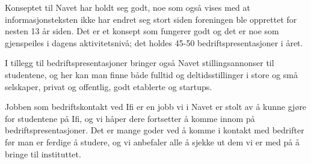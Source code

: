 Konseptet til Navet har holdt seg godt, noe som også vises med at informasjonsteksten ikke har endret seg stort siden foreningen ble opprettet for nesten 13 år siden. Det er et konsept som fungerer godt og det er noe som gjenspeiles i dagens aktivitetsnivå; det holdes 45-50 bedriftspresentasjoner i året.

I tillegg til bedriftspresentasjoner bringer også Navet stillingsannonser til studentene, og her kan man finne både fulltid og deltidsstillinger i store og små selskaper, privat og offentlig, godt etablerte og startups.

Jobben som bedriftskontakt ved Ifi er en jobb vi i Navet er stolt av å kunne gjøre for studentene på Ifi, og vi håper dere fortsetter å komme innom på bedriftspresentasjoner. Det er mange goder ved å komme i kontakt med bedrifter før man er ferdige å studere, og vi anbefaler alle å sjekke ut dem vi er med på å bringe til instituttet.
